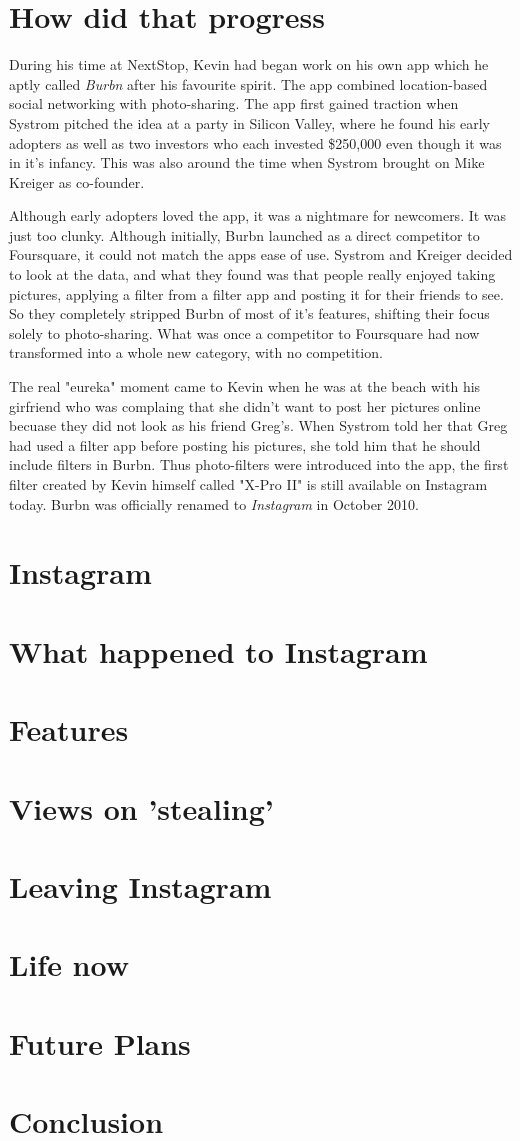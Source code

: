 \documentclass[12pt]{article}
\begin{document}
    \section{How did that progress}
    During his time at NextStop, Kevin had began work on his own app which he 
    aptly called \textit{Burbn} after  his favourite spirit. The app combined location-based social networking with photo-sharing.
    The app first gained traction when Systrom
    pitched the idea at a party in Silicon Valley, where he found his early adopters as well as two investors who each
    invested \$250,000 even though it was in it's infancy. This was also around the time when Systrom brought on Mike Kreiger as co-founder.

    Although early adopters loved the app, it was a nightmare for newcomers. It was just too clunky. Although initially, Burbn launched
    as a direct competitor to Foursquare, it could not match the apps ease of use. Systrom and Kreiger decided to look at the data,
    and what they found was that people really enjoyed taking pictures, applying a filter from a filter app and posting it for their friends to see. So they completely stripped Burbn of 
    most of it's features, shifting their focus solely to photo-sharing. What was once a competitor to Foursquare had now transformed into a whole new category, with no competition.

    The real "eureka" moment came to Kevin when he was at the beach with his girfriend who was complaing that she didn't want to post
    her pictures online becuase they did not look as his friend Greg's. When Systrom told her that Greg had used a filter app before posting
    his pictures, she told him that he should include filters in Burbn. Thus photo-filters were introduced into the app, the first filter
    created by Kevin himself called "X-Pro II" is still available on Instagram today. Burbn was officially renamed to \textit{Instagram} in
    October 2010.

    \section{Instagram}
    \section{What happened to Instagram}
    \section{Features}
    \section{Views on 'stealing'}
    \section{Leaving Instagram}
    \section{Life now}
    \section{Future Plans}

    \section{Conclusion}
\end{document}
